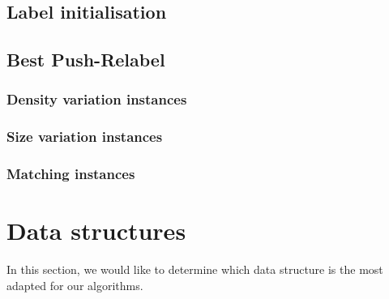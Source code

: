 \subsection{Label initialisation}
\subsection{Best Push-Relabel}
\subsubsection{Density variation instances}
\subsubsection{Size variation instances}
\subsubsection{Matching instances}
\section{Data structures}
In this section, we would like to determine which data structure is the most adapted for our algorithms.
